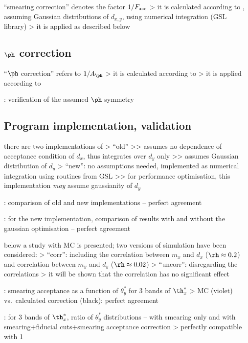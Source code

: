 \> ``smearing correction'' denotes the factor $1/F_{\rm acc}$
\>> it is calculated according to , assuming Gaussian distributions of $d_{x,y}$, using numerical integration (GSL library)
\>> it is applied as described below 


\subsection{$\ph$ correction}

\> ``$\ph$ correction'' refers to $1 / A_{\ph}$
\>> it is calculated according to 
\>> it is applied according to 


\>  : verification of the assumed $\ph$ symmetry


\subsection{Program implementation, validation}

\> there are two implementations of 
\>> ``old''
\>>> assumes no dependence of acceptance condition of $d_x$, thus integrates over $d_y$ only
\>>> assumes Gaussian distribution of $d_y$
\>> ``new'': no assumptions needed, implemented as numerical integration using routines from GSL
\>>> for performance optimisation, this implementation {\it may} assume gaussianity of $d_y$

\>  : comparison of old and new implementations -- perfect agreement

\>  : for the new implementation, comparison of results with and without the gaussian optimisation -- perfect agreement

\> below a study with MC is presented; two versions of simulation have been considered:
\>> ``corr'': including the correlation between $m_x$ and $d_x$ ($\rh \approx 0.2$) and correlation between $m_y$ and $d_y$ ($\rh\approx 0.02$)
\>> ``uncorr'': disregarding the correlations
\>> it will be shown that the correlation has no significant effect

\>  : smearing acceptance as a function of $\theta^*_y$ for 3 bands of $\th^*_x$
\>> MC (violet) vs.~calculated correction (black): perfect agreement

\>  : for 3 bands of $\th^*_x$, ratio of $\theta^*_y$ distributions -- with smearing only and with smearing+fiducial cuts+smearing acceptance correction
\>> perfectly compatible with 1

